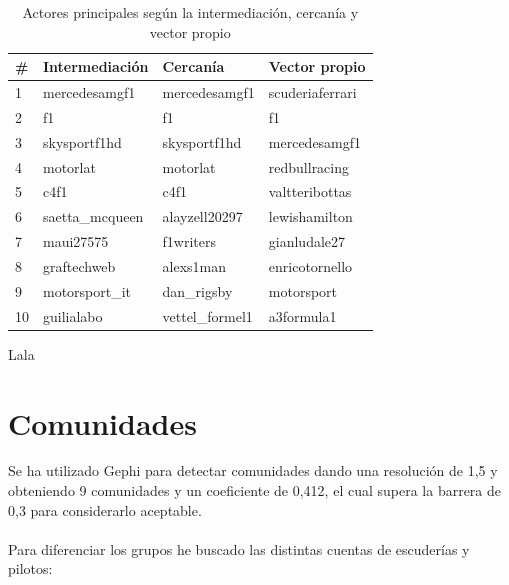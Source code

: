 \begin{table}[H]
	\centering
	\caption{Actores principales según la intermediación, cercanía y vector propio}
	\label{actores-principales-medidas-centralidad}
	\begin{tabular}{| l | l l l |}
		\hline
		\#      & Intermediación  & Cercanía        & Vector propio   \\
		\hline
		1       & mercedesamgf1   & mercedesamgf1   & scuderiaferrari \\
		2       & f1              & f1              & f1              \\
		3       & skysportf1hd    & skysportf1hd    & mercedesamgf1   \\
		4       & motorlat        & motorlat        & redbullracing   \\
		5       & c4f1            & c4f1            & valtteribottas  \\
		6       & saetta\_mcqueen & alayzell20297   & lewishamilton   \\
		7       & maui27575       & f1writers       & gianludale27    \\
		8       & graftechweb     & alexs1man       & enricotornello  \\
		9       & motorsport\_it  & dan\_rigsby     & motorsport      \\
		10      & guilialabo      & vettel\_formel1 & a3formula1      \\
		\hline
	\end{tabular}
\end{table}

Lala

\section{Comunidades}

Se ha utilizado Gephi para detectar comunidades dando una resolución de 1,5 y obteniendo 9 comunidades y un coeficiente de 0,412, el cual supera la barrera de 0,3 para considerarlo aceptable.
\\ \\
Para diferenciar los grupos he buscado las distintas cuentas de escuderías y pilotos:

